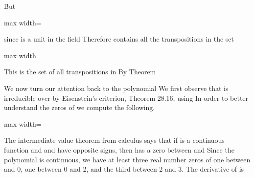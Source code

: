 \documentclass[11pt,oneside]{article}
\begin{document}
\begin{BookBody}
\noindent But

\begin{center}\begin{adjustbox}{max width=\linewidth}\end{adjustbox}\end{center}

\noindent since  is a unit in the field  Therefore contains all the transpositions in the set

\begin{center}\begin{adjustbox}{max width=\linewidth}\end{adjustbox}\end{center}

\noindent This is the set of all transpositions in  By Theorem  \BookEnd{\blacklozenge}

\noindent We now turn our attention back to the polynomial  We first observe that  is irreducible over  by Eisenstein’s criterion, Theorem 28.16, using  In order to better understand the zeros of  we compute the following.

\begin{center}\begin{adjustbox}{max width=\linewidth}\end{adjustbox}\end{center}

The intermediate value theorem from calculus says that if  is a continuous function and  and  have opposite signs, then  has a zero between  and  Since the polynomial  is continuous, we have at least three real number zeros of  one between  and 0, one between 0 and 2, and the third between 2 and 3. The derivative of  is


\end{BookBody}
\end{document}
